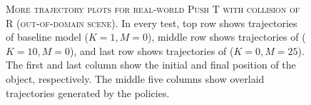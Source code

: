 \begin{figure}[h]
\begin{minipage}{\textwidth}
\begin{tabular}{c}
            
        \end{tabular}
    \end{minipage}
    \vspace{-2mm} 
    \caption{\textsc{More trajectory plots for real-world Push T with collision of R (out-of-domain scene).} In every test, top row shows trajectories of baseline model ($K=1, M=0$), middle row shows trajectories of \gpcrank ($K=10, M=0$), and last row shows trajectories of \gpcopt ($K=0, M=25$). The first and last column show the initial and final position of the object, respectively. The middle five columns show overlaid trajectories generated by the policies. 
    \label{fig:fig-real_world_appendix_push_tr}}
\end{figure}